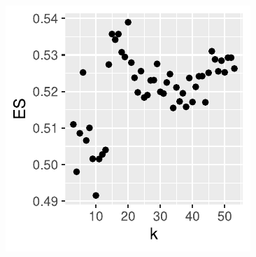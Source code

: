 \documentclass{beamer}
\begin{document}
{\begin{columns}
\begin{column}{0.40\textwidth}
			\includegraphics[width=\textwidth]{k_ES.pdf}
		\end{column}
	\end{columns}
}
\end{document}
